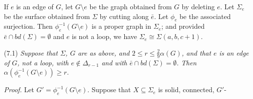 If $e$ is an edge of $G$, let $G \setminus e$ be the graph obtained from $G$ by deleting $e$. Let $\Sigma_e$ be the surface obtained from $\Sigma$ by cutting along $\bar{e}$. Let $\phi_e$ be the associated surjection. Then $\phi_e^{-1}(G \setminus e)$ is a proper graph in $\Sigma_e$; and provided $\bar{e} \cap bd(\Sigma) = \emptyset$ and $e$ is not a loop, we have $\Sigma_e \cong \Sigma(a, b, c + 1)$.

\stmt
(7.1) \textit{Suppose that $\Sigma$, $G$ are as above, and $2 \le r \le \frac{2}{9}\alpha(G)$, and that $e$ is an edge of $G$, not a loop, with $e \notin \Delta_{r-1}$ and with $\bar{e} \cap bd(\Sigma) = \emptyset$. Then $\alpha(\phi_e^{-1}(G \setminus e)) \ge r$.}

\textit{Proof.} Let $G' = \phi_e^{-1}(G \setminus e)$. Suppose that $X \subseteq \Sigma_e$ is solid, connected, $G'$-
